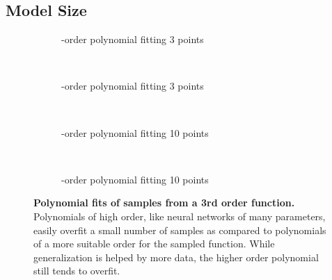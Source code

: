 \documentclass[thesis]{subfiles}
\begin{document}
    \subsection{Model Size}\label{modelsize}
	\begin{figure}[tbp]
		\centering
		\begin{subfigure}[t]{0.48\textwidth}
			\resizebox{\linewidth}{!}{}
			\caption{-order polynomial fitting 3 points}
			\label{fig:polyfit3rd}
		\end{subfigure}
		~
		\begin{subfigure}[t]{0.48\textwidth}
			\resizebox{\linewidth}{!}{}
			\caption{-order polynomial fitting 3 points}
			\label{fig:polyfit20th}
		\end{subfigure}\\	
		\begin{subfigure}[t]{0.48\textwidth}
			\resizebox{\linewidth}{!}{}
			\caption{-order polynomial fitting 10 points}
			\label{fig:polyfit3rdlots}
		\end{subfigure}
		~
		\begin{subfigure}[t]{0.48\textwidth}
			\resizebox{\linewidth}{!}{}
			\caption{-order polynomial fitting 10 points}
			\label{fig:polyfit20thlots}
		\end{subfigure}
		\caption[Polynomial fits of samples from a 3rd order function]{\textbf{Polynomial fits of samples from a 3rd order function.} Polynomials of high order, like neural networks of many parameters, easily overfit a small number of samples as compared to polynomials of a more suitable order for the sampled function. While generalization is helped by more data, the higher order polynomial still tends to overfit.}
		\label{fig:polyfits}
	\end{figure}
\end{document}
